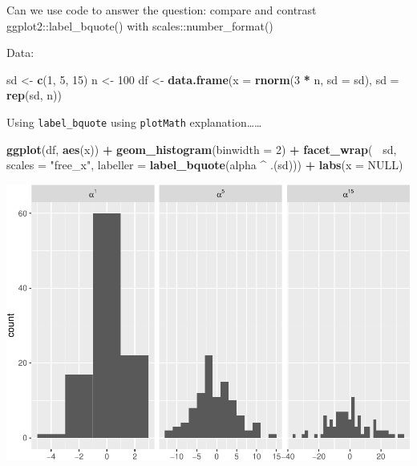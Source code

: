 \documentclass[]{book}
\newenvironment{Shaded}{\begin{snugshade}}{\end{snugshade}}
\newcommand{\DataTypeTok}[1]{\textcolor[rgb]{0.13,0.29,0.53}{#1}}
\newcommand{\DecValTok}[1]{\textcolor[rgb]{0.00,0.00,0.81}{#1}}
\newcommand{\KeywordTok}[1]{\textcolor[rgb]{0.13,0.29,0.53}{\textbf{#1}}}
\newcommand{\NormalTok}[1]{#1}
\newcommand{\OperatorTok}[1]{\textcolor[rgb]{0.81,0.36,0.00}{\textbf{#1}}}
\newcommand{\OtherTok}[1]{\textcolor[rgb]{0.56,0.35,0.01}{#1}}
\newcommand{\StringTok}[1]{\textcolor[rgb]{0.31,0.60,0.02}{#1}}
\begin{document}
Can we use code to answer the question: compare and contrast ggplot2::label\_bquote() with scales::number\_format()

Data:

\begin{Shaded}
\begin{Highlighting}[]
\NormalTok{sd <-}\StringTok{ }\KeywordTok{c}\NormalTok{(}\DecValTok{1}\NormalTok{, }\DecValTok{5}\NormalTok{, }\DecValTok{15}\NormalTok{)}
\NormalTok{n <-}\StringTok{ }\DecValTok{100}
\NormalTok{df <-}\StringTok{ }\KeywordTok{data.frame}\NormalTok{(}\DataTypeTok{x =} \KeywordTok{rnorm}\NormalTok{(}\DecValTok{3} \OperatorTok{*}\StringTok{ }\NormalTok{n, }\DataTypeTok{sd =}\NormalTok{ sd), }\DataTypeTok{sd =} \KeywordTok{rep}\NormalTok{(sd, n))}
\end{Highlighting}
\end{Shaded}

Using \texttt{label\_bquote} using \texttt{plotMath} explanation\ldots{}\ldots{}

\begin{Shaded}
\begin{Highlighting}[]
\KeywordTok{ggplot}\NormalTok{(df, }\KeywordTok{aes}\NormalTok{(x)) }\OperatorTok{+}\StringTok{ }
\StringTok{  }\KeywordTok{geom_histogram}\NormalTok{(}\DataTypeTok{binwidth =} \DecValTok{2}\NormalTok{) }\OperatorTok{+}\StringTok{ }
\StringTok{  }\KeywordTok{facet_wrap}\NormalTok{(}\OperatorTok{~}\StringTok{ }\NormalTok{sd, }\DataTypeTok{scales =} \StringTok{"free_x"}\NormalTok{, }\DataTypeTok{labeller =} \KeywordTok{label_bquote}\NormalTok{(alpha }\OperatorTok{^}\StringTok{ }\NormalTok{.(sd))) }\OperatorTok{+}\StringTok{ }
\StringTok{  }\KeywordTok{labs}\NormalTok{(}\DataTypeTok{x =} \OtherTok{NULL}\NormalTok{) }
\end{Highlighting}
\end{Shaded}

\includegraphics{AdvancedR_Companion_files/figure-latex/unnamed-chunk-242-1.pdf}
\end{document}
